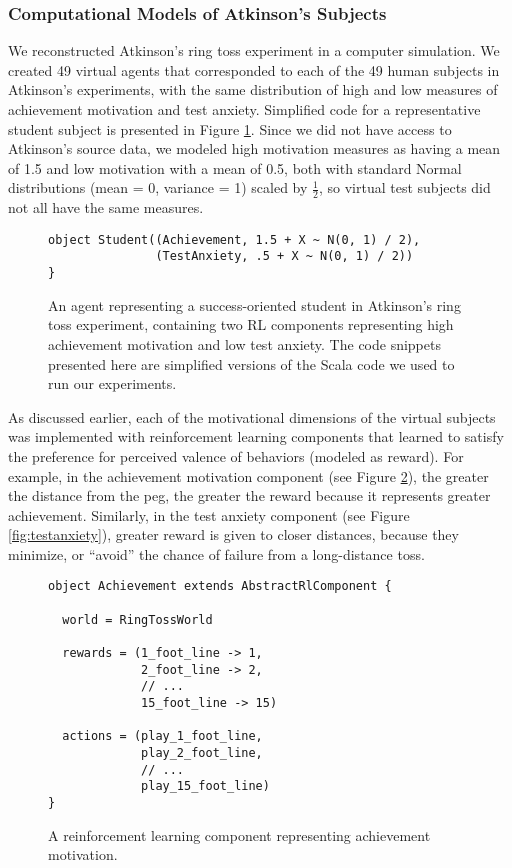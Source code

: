 \subsubsection{Computational Models of Atkinson's Subjects}

We reconstructed Atkinson's ring toss experiment in a computer simulation.  We created 49 virtual agents that corresponded to each of the 49 human subjects in Atkinson's experiments, with the same distribution of high and low measures of achievement motivation and test anxiety.  Simplified code for a representative student subject is presented in Figure \ref{fig:student}.  Since we did not have access to Atkinson's source data, we modeled high motivation measures as having a mean of 1.5 and low motivation with a mean of 0.5, both with standard Normal distributions (mean = 0, variance = 1) scaled by $\frac{1}{2}$, so virtual test subjects did not all have the same measures.

\begin{figure}[h]

\begin{lstlisting}
object Student((Achievement, 1.5 + X ~ N(0, 1) / 2),
               (TestAnxiety, .5 + X ~ N(0, 1) / 2))
}
\end{lstlisting}

\caption{An agent representing a success-oriented student in Atkinson's ring toss experiment, containing two RL components representing high achievement motivation and low test anxiety.  The code snippets presented here are simplified versions of the Scala code we used to run our experiments.}
\label{fig:student}
\end{figure}

As discussed earlier, each of the motivational dimensions of the virtual subjects was implemented with reinforcement learning components that learned to satisfy the preference for perceived valence of behaviors (modeled as reward).  For example, in the achievement motivation component (see Figure \ref{fig:achievement}), the greater the distance from the peg, the greater the reward because it represents greater achievement.  Similarly, in the test anxiety component (see Figure \ref{fig:testanxiety}), greater reward is given to closer distances, because they minimize, or ``avoid'' the chance of failure from a long-distance toss.

\begin{figure}[h]
\begin{lstlisting}
object Achievement extends AbstractRlComponent {

  world = RingTossWorld

  rewards = (1_foot_line -> 1,
             2_foot_line -> 2,
             // ...
             15_foot_line -> 15)

  actions = (play_1_foot_line,
             play_2_foot_line,
             // ...
             play_15_foot_line)
}
\end{lstlisting}
\caption{A reinforcement learning component representing achievement motivation.}
\label{fig:achievement}
\end{figure}

